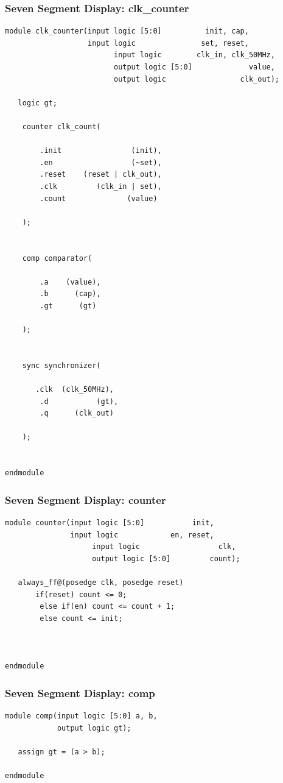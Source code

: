 \documentclass[a4paper]{article}
\begin{document}
\subsubsection{Seven Segment Display: clk_counter}
\begin{Verbatim}
module clk_counter(input logic [5:0]          init, cap,
                   input logic               set, reset,
						 input logic        clk_in, clk_50MHz,
						 output logic [5:0]             value,
						 output logic                 clk_out);

   logic gt;
	
	counter clk_count(
	   
		.init                (init),
		.en                  (~set),
		.reset    (reset | clk_out),
		.clk         (clk_in | set),
		.count              (value)
	
	);
	
	
	comp comparator(
	   
		.a    (value),   
		.b      (cap),
		.gt      (gt)
	
	);
	

	sync synchronizer(
	
	   .clk  (clk_50MHz),
		.d           (gt),
		.q      (clk_out)
	
	);
	

endmodule 
\end{Verbatim}

\subsubsection{Seven Segment Display: counter}
\begin{Verbatim}
module counter(input logic [5:0]           init,
               input logic            en, reset,
					input logic                  clk,
					output logic [5:0]         count);
					
   always_ff@(posedge clk, posedge reset)
	   if(reset) count <= 0;
		else if(en) count <= count + 1;
		else count <= init;



endmodule 
\end{Verbatim}

\subsubsection{Seven Segment Display: comp}
\begin{Verbatim}
module comp(input logic [5:0] a, b,
            output logic gt);
 
   assign gt = (a > b);

endmodule 
\end{Verbatim}
\end{document}
